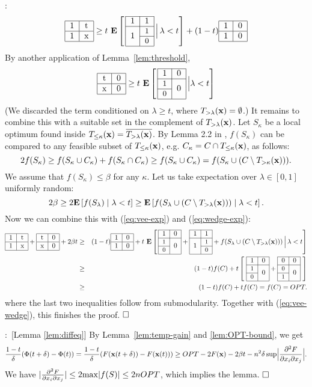 \documentclass{article}[11pt]
\newcommand{\mixdiff}[3]{\frac{\partial^2 {#1}}{{\partial {#2}}{\partial {#3}}}}
\newcommand{\E}[1]{{\bf{E}}\left[#1\right]}
\renewenvironment{proof}{\noindent{\bf Proof}:~}{$\hfill \Box$\\}
\newcommand{\T}[4] {\begin{tabular}{|c|c|}
\hline
#1 & #2 \\
\hline
#3 & #4 \\
\hline
\end{tabular}}
\newcommand{\TTR}[5]{\begin{tabular}{|c|c|l}
\cline{1-2}
#1 & #2 \\
\cline{1-2}
\multirow{2}{*}{#3} & {\small{#4}} \\
\cline{2-2}
& {\small{#5}} \\
\cline{1-2}
\end{tabular}}
\newcommand{\TTL}[5]{\begin{tabular}{|c|c|}
\cline{1-2}
 #1 & #2 \\
\cline{1-2}
{\small{#3}} & \multirow{2}{*}{#5}  \\
\cline{1-1}
 {\small{#4}} &  \\
\cline{1-2}
\end{tabular}}
\def\bx{{\bf x}}
\def\max{{\rm{max}}}
\def\sup{{\rm{sup}}}
\begin{document}
\begin{proof}
\begin{equation}
\label{eq:vee-exp}
\T{1}{t}{1}{x}\geq t~\E{ \, \TTR{1}{1}{1}{1}{0} \, \Big| \, \lambda < t} +  (1-t) \T{1}{0}{1}{0}
\end{equation}
By another application of Lemma~\ref{lem:threshold},
\begin{equation}
\label{eq:wedge-exp}
\T{t}{0}{x}{0} \geq t~\E{ \, \TTL{1}{0}{1}{0}{0} \, \Big| \lambda < t}\end{equation}
(We discarded the term conditioned on $\lambda \geq t$, where $T_{>\lambda}(\bx) = \emptyset$.)
It remains to combine this with a suitable set in the complement of $T_{>\lambda}(\bx)$.
Let $S_\kappa$ be a local optimum found inside $T_{\le\kappa}(\bx) = \overline{T_{>\lambda}(\bx)}$.
By Lemma 2.2 in \cite{LMNS09}, $f(S_\kappa)$ can be compared to any feasible subset
of $T_{\le\kappa}(\bx)$, e.g. $C_\kappa = C \cap T_{\le\kappa}(\bx)$, as follows:
$$ 2 f(S_\kappa) \geq f(S_\kappa \cup C_\kappa) + f(S_\kappa \cap C_\kappa)
 \geq f(S_\kappa \cup C_\kappa) = f(S_\kappa \cup (C \setminus T_{>\kappa}(\bx))).$$
We assume that $f(S_\kappa) \leq \beta$ for any $\kappa$.
Let us take expectation over $\lambda \in [0,1]$ uniformly random:
$$ 2 \beta \geq 2 \E{f(S_\lambda) \mid \lambda < t} \geq
\E{f(S_\lambda \cup (C \setminus T_{>\lambda}(\bx))) \mid \lambda < t}.
$$
Now we can combine this with (\ref{eq:vee-exp}) and (\ref{eq:wedge-exp}):
\begin{eqnarray*}
 \T{1}{t}{1}{x} + \T{t}{0}{x}{0} + 2 \beta t & \geq &
 (1-t) \T{1}{0}{1}{0} + t~\E{ \, \TTL{1}{0}{1}{0}{0} + \TTR{1}{1}{1}{1}{0}
  + f(S_\lambda \cup (C \setminus T_{>\lambda}(\bx))) \, \Big| \, \lambda < t} \\
& \geq & (1-t) f(C) + t\left[~ \TTL{1}{0}{1}{0}{0} +  \TTL{0}{0}{0}{1}{0} ~\right]  \\
& \geq & (1-t) f(C) + t f(C) = f(C) = OPT.
\end{eqnarray*}
where the last two inequalities follow from submodularity. 
Together with (\ref{eq:vee-wedge}), this finishes the proof.
\end{proof}




\begin{proof}[Lemma \ref{lem:diffeq}]
By Lemma~\ref{lem:temp-gain} and \ref{lem:OPT-bound}, we get
$$
\frac{1-t}{\delta} (\Phi(t+\delta)-\Phi(t)) = \frac{1-t}{\delta} (F(\bx(t+\delta)) - F(\bx(t)))
 \geq OPT - 2 F(\bx) - 2 \beta t - n^2 \delta \, \sup \Big| \mixdiff{F}{x_i}{x_j} \Big|.$$
We have $|\mixdiff{F}{x_i}{x_j}| \leq 2 \max |f(S)| \leq 2n OPT$,
which implies the lemma.
\end{proof}
\end{document}
